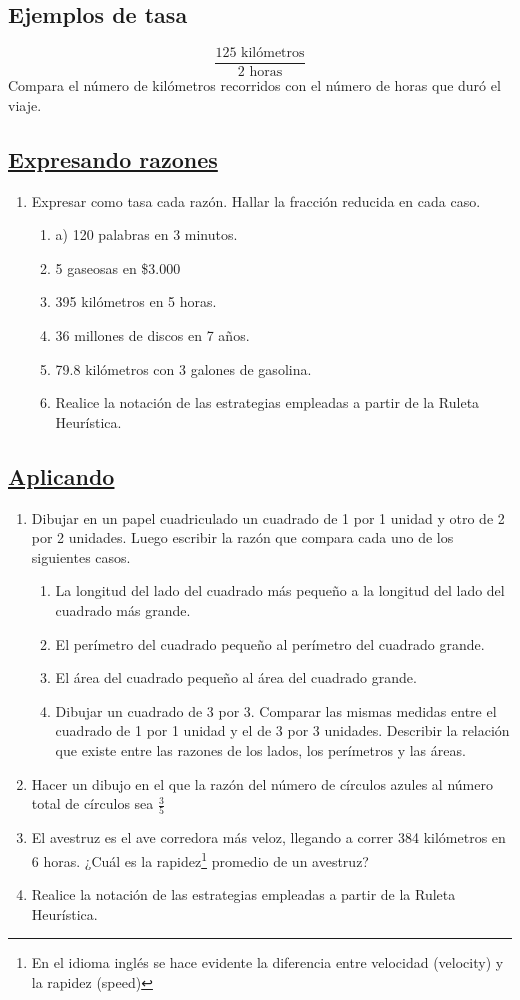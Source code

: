 \documentclass[10pt,twoside]{article}
\begin{document}
\subsection*{Ejemplos de tasa}
\[\dfrac{125\text{ kil\'{o}metros}}{2\text{ horas}}\] Compara el n\'{u}mero de kil\'{o}metros recorridos con el n\'{u}mero de horas que dur\'{o} el viaje.
\subsection*{\underline{Expresando razones}}
\begin{enumerate}
\item Expresar como tasa cada razón. Hallar la fracción reducida en cada caso.
\begin{enumerate}
\item a) 120 palabras en 3 minutos.
\item 5 gaseosas en \$3.000
\item 395 kilómetros en 5 horas.
\item 36 millones de discos en 7 años.
\item 79.8 kilómetros con 3 galones de gasolina.
\item Realice la notación de las estrategias empleadas a partir de la Ruleta Heurística.
\end{enumerate}
\end{enumerate}
\subsection*{\underline{Aplicando}}
\begin{enumerate}
\item Dibujar en un papel cuadriculado un cuadrado de 1 por 1 unidad y otro de 2 por 2 unidades. Luego escribir la razón que compara cada  uno de los siguientes casos.
\begin{enumerate}
\item La longitud del lado del cuadrado más pequeño a la longitud del lado del cuadrado más grande.
\item El perímetro del cuadrado pequeño al perímetro del cuadrado grande.
\item El área del cuadrado pequeño al área del cuadrado grande.
\item Dibujar un cuadrado de 3 por 3. Comparar las mismas medidas entre el cuadrado de 1 por 1 unidad y el de 3 por 3 unidades.  Describir la relación que existe entre las razones de los lados, los perímetros y las áreas.
\end{enumerate}
\item Hacer un dibujo en el que la razón del número de círculos azules al número total de círculos sea $\frac{3}{5}$
\item El avestruz es el ave corredora más veloz, llegando a correr 384 kilómetros en 6 horas. ¿Cuál es la rapidez\footnote{En el idioma inglés se hace evidente la diferencia entre velocidad (velocity) y la rapidez (speed)} promedio de un avestruz?
\item Realice la notación de las estrategias empleadas a partir de la Ruleta Heurística.
\end{enumerate}
\end{document}
